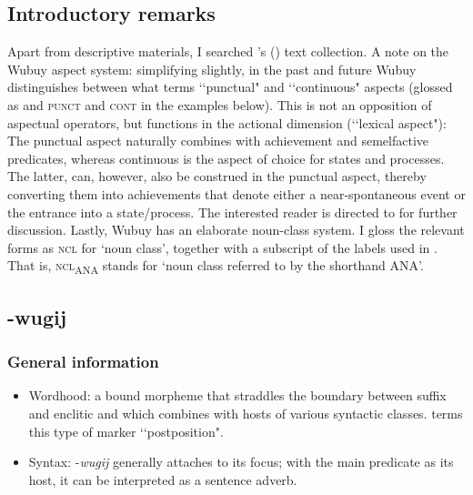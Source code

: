 \subsection{Introductory remarks}
Apart from descriptive materials, I searched \citeauthor{Heath1980}'s (\citeyear{Heath1980}) text collection. A note on the Wubuy aspect system: simplifying slightly, in the past and future Wubuy distinguishes between what \textcite{Heath1984} terms \lq\lq punctual" and \lq\lq continuous" aspects (glossed as and \textsc{punct} and \textsc{cont} in the examples below). This is not an opposition of aspectual operators, but functions in the actional dimension (\lq\lq lexical aspect"): The punctual aspect naturally combines with achievement and semelfactive predicates, whereas continuous is the aspect of choice for states and processes. The latter, can, however, also be construed in the punctual aspect, thereby converting them into achievements that denote either a near-spontaneous event or the entrance into a state/process. The interested reader is directed to \textcite[337–341]{Heath1984} for further discussion. Lastly, Wubuy has an elaborate noun-class system. I gloss the relevant forms as \textsc{ncl} for \lq noun class', together with a subscript of the labels used in  \textcite{Heath1984}. That is, \textsc{ncl}\textsubscript{ANA} stands for \lq noun class referred to by the shorthand ANA'.

\subsection{-wugij}
\subsubsection{General information}
\begin{itemize}
	\item Wordhood: a bound morpheme that straddles the boundary between suffix and enclitic and which combines with hosts of various syntactic classes. \textcite{Heath1984} terms this type of marker \lq\lq postposition". 
	\item Syntax: -\textit{wugij} generally attaches to its focus; with the main predicate as its host, it can be interpreted as a sentence adverb.
\end{itemize}

